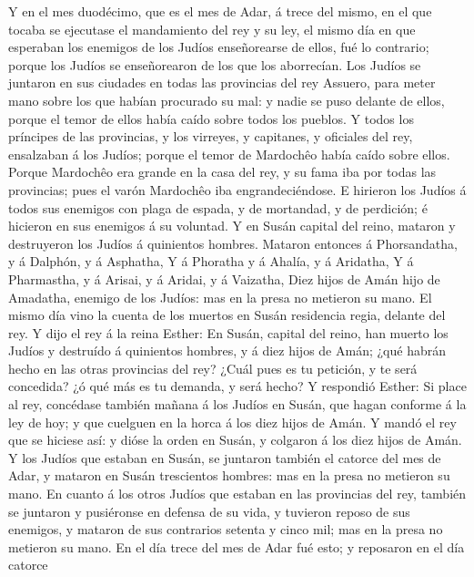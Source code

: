  Y en el mes duodécimo, que es el mes de Adar, á trece del
mismo, en el que tocaba se ejecutase el mandamiento del rey y su ley, el
mismo día en que esperaban los enemigos de los Judíos enseñorearse de
ellos, fué lo contrario; porque los Judíos se enseñorearon de los que
los aborrecían.  Los Judíos se juntaron en sus ciudades en
todas las provincias del rey Assuero, para meter mano sobre los que
habían procurado su mal: y nadie se puso delante de ellos, porque el
temor de ellos había caído sobre todos los pueblos.  Y todos
los príncipes de las provincias, y los virreyes, y capitanes, y
oficiales del rey, ensalzaban á los Judíos; porque el temor de Mardochêo
había caído sobre ellos.  Porque Mardochêo era grande en la
casa del rey, y su fama iba por todas las provincias; pues el varón
Mardochêo iba engrandeciéndose.  E hirieron los Judíos á
todos sus enemigos con plaga de espada, y de mortandad, y de perdición;
é hicieron en sus enemigos á su voluntad.  Y en Susán
capital del reino, mataron y destruyeron los Judíos á quinientos
hombres.  Mataron entonces á Phorsandatha, y á Dalphón, y á
Asphatha,  Y á Phoratha y á Ahalía, y á Aridatha,
 Y á Pharmastha, y á Arisai, y á Aridai, y á Vaizatha,
 Diez hijos de Amán hijo de Amadatha, enemigo de los
Judíos: mas en la presa no metieron su mano.  El mismo día
vino la cuenta de los muertos en Susán residencia regia, delante del
rey.  Y dijo el rey á la reina Esther: En Susán, capital
del reino, han muerto los Judíos y destruído á quinientos hombres, y á
diez hijos de Amán; ¿qué habrán hecho en las otras provincias del rey?
¿Cuál pues es tu petición, y te será concedida? ¿ó qué más es tu
demanda, y será hecho?  Y respondió Esther: Si place al
rey, concédase también mañana á los Judíos en Susán, que hagan conforme
á la ley de hoy; y que cuelguen en la horca á los diez hijos de Amán.
 Y mandó el rey que se hiciese así: y dióse la orden en
Susán, y colgaron á los diez hijos de Amán.  Y los Judíos
que estaban en Susán, se juntaron también el catorce del mes de Adar, y
mataron en Susán trescientos hombres: mas en la presa no metieron su
mano.  En cuanto á los otros Judíos que estaban en las
provincias del rey, también se juntaron y pusiéronse en defensa de su
vida, y tuvieron reposo de sus enemigos, y mataron de sus contrarios
setenta y cinco mil; mas en la presa no metieron su mano. 
En el día trece del mes de Adar fué esto; y reposaron en el día catorce
